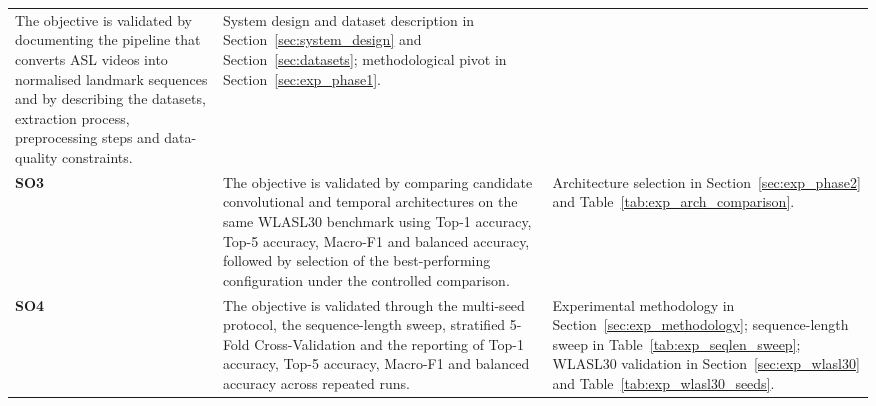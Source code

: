 \begin{table}[!htbp]
\begin{tabular}{@{}p{1.3cm} p{5.8cm} p{5.6cm}@{}}
        The objective is validated by documenting the pipeline that converts ASL videos into normalised landmark sequences and by describing the datasets, extraction process, preprocessing steps and data-quality constraints.                                                                   &
        System design and dataset description in Section~\ref{sec:system_design} and Section~\ref{sec:datasets}; methodological pivot in Section~\ref{sec:exp_phase1}.                                                                                                                                                                                                          \\
        \addlinespace
        \textbf{SO3}                                                                                                                                                                                                                                                                               &
        The objective is validated by comparing candidate convolutional and temporal architectures on the same WLASL30 benchmark using Top-1 accuracy, Top-5 accuracy, Macro-F1 and balanced accuracy, followed by selection of the best-performing configuration under the controlled comparison. &
        Architecture selection in Section~\ref{sec:exp_phase2} and Table~\ref{tab:exp_arch_comparison}.                                                                                                                                                                                                                                                                         \\
        \addlinespace
        \textbf{SO4}                                                                                                                                                                                                                                                                               &
        The objective is validated through the multi-seed protocol, the sequence-length sweep, stratified 5-Fold Cross-Validation and the reporting of Top-1 accuracy, Top-5 accuracy, Macro-F1 and balanced accuracy across repeated runs.                                                        &
        Experimental methodology in Section~\ref{sec:exp_methodology}; sequence-length sweep in Table~\ref{tab:exp_seqlen_sweep}; WLASL30 validation in Section~\ref{sec:exp_wlasl30} and Table~\ref{tab:exp_wlasl30_seeds}.                                                                                                                                                    \\

\end{tabular}
\end{table}
